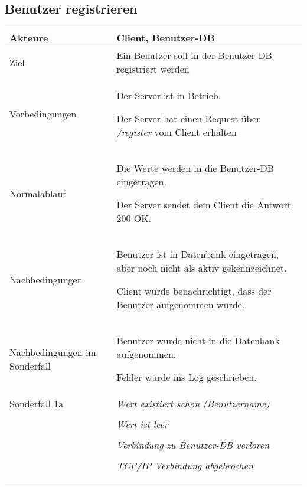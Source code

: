 \documentclass[a4paper,10pt,titlepage,parskip=true]{article}
\makeatletter
\newcommand\novspace{\@minipagetrue}
\newenvironment{owncompactitem}{%
\compactitem
}{%
\@finalstrut\@arstrutbox
\@nameuse{endcompactitem}%
\aftergroup\let\aftergroup\@finalstrut\aftergroup\@gobble
}
\newenvironment{owncompactenum}{%
\compactenum
}{%
\@finalstrut\@arstrutbox
\@nameuse{endcompactenum}%
\aftergroup\let\aftergroup\@finalstrut\aftergroup\@gobble
}
\newcommand{\usecase}[7]
{\subsection{#1}
\setlength{\extrarowheight}{2pt}
\begin{tabular}{|p{0.2\textwidth}|p{0.9\textwidth}|}
\hline
  Akteure & #2\\\hline
  Ziel & #3\\\hline
  Vorbedingungen & \novspace
  	\begin{owncompactitem}[-] #4 \end{owncompactitem} \\\hline
  Normalablauf & \vspace{-7pt}
  	\begin{owncompactenum}[1.] #6 \end{owncompactenum} \\\hline
  Nachbedingungen & \novspace
  	\begin{owncompactitem}[-] #5 \end{owncompactitem} \\\hline
  #7
\end{tabular}
}
\newcommand{\sonderfall}[4][\empty]
{
Sonderfall #2 & \vspace{-10pt}
	\textit{#3}
	\begin{owncompactenum}[{#2}.1] {#4} \end{owncompactenum}
  	\ifthenelse{\equal{#1}{\empty}}
    	{\\\hline} %
    	{\ensuremath{\rightarrow} #1 \\ [+1pt] \hline} %

}
\newcommand{\sondernachbedingung}[1]
{
Nachbedingungen im Sonderfall& \novspace
	\begin{owncompactitem}[-]
		#1
	\end{owncompactitem} \\\hline
}
\makeatother
\begin{document}
\usecase{Benutzer registrieren}{Client, Benutzer-DB}%
{Ein Benutzer soll in der Benutzer-DB registriert werden}%
{%
  \item Der Server ist in Betrieb.
  \item Der Server hat einen Request über \textit{/register} vom Client erhalten
}
{%
  \item Benutzer ist in Datenbank eingetragen, aber noch nicht als aktiv gekennzeichnet.
  \item Client wurde benachrichtigt, dass der Benutzer aufgenommen wurde.
}
{%
  \item  Die Werte werden in die Benutzer-DB eingetragen.
  \item  Der Server sendet dem Client die Antwort 200 OK.
}
{%
  \sondernachbedingung{
	\item Benutzer wurde nicht in die Datenbank aufgenommen.
	\item Fehler wurde ins Log geschrieben.
	}
  
  \sonderfall[Fehler]{1a}%
	  {Wert existiert schon (Benutzername)}%
	  {
	  \item Der Fehler wird ins Log geschrieben.
	  \item Dem Client wird ein entsprechender Fehler übermittelt.
	  } 

  \sonderfall[Fehler]{1b}%
	  {Wert ist leer}%
	  {
	  \item Der Fehler wird ins Log geschrieben.
	  \item Dem Client wird ein entsprechender Fehler übermittelt.
	  }

	  \sonderfall[Kritischer Fehler, Server ist beendet]{*}%
	{Verbindung zu Benutzer-DB verloren}%
  	{
	\item Der Fehler wird ins Log geschrieben (als schwerwiegender Fehler)
	\item Der Client erhält eine entsprechende Fehlermeldung
	\item Der Server wird beendet
  	}

\sonderfall[Weiter mit normalem Betrieb]{**}%
	{TCP/IP Verbindung abgebrochen}%
	{
	\item Fehlermeldung wird ins Log geschrieben
	}
}
\end{document}

